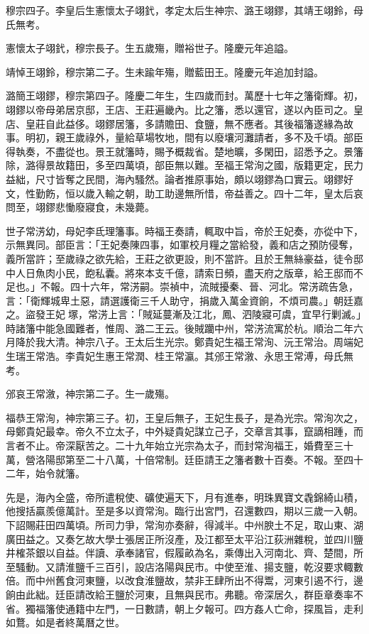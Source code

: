 穆宗四子。李皇后生憲懷太子翊釴，孝定太后生神宗、潞王翊鏐，其靖王翊鈴，母氏無考。

憲懷太子翊釴，穆宗長子。生五歲殤，贈裕世子。隆慶元年追謚。

靖悼王翊鈴，穆宗第二子。生未踰年殤，贈藍田王。隆慶元年追加封謚。

潞簡王翊鏐，穆宗第四子。隆慶二年生，生四歲而封。萬歷十七年之籓衛輝。初，翊鏐以帝母弟居京邸，王店、王莊遍畿內。比之籓，悉以還官，遂以內臣司之。皇店、皇莊自此益侈。翊鏐居籓，多請贍田、食鹽，無不應者。其後福籓遂緣為故事。明初，親王歲祿外，量給草場牧地，間有以廢壤河灘請者，多不及千頃。部臣得執奏，不盡從也。景王就籓時，賜予概裁省。楚地曠，多閑田，詔悉予之。景籓除，潞得景故籍田，多至四萬頃，部臣無以難。至福王常洵之國，版籍更定，民力益絀，尺寸皆奪之民間，海內騷然。論者推原事始，頗以翊鏐為口實云。翊鏐好文，性勤飭，恒以歲入輸之朝，助工助邊無所惜，帝益善之。四十二年，皇太后哀問至，翊鏐悲慟廢寢食，未幾薨。

世子常淓幼，母妃李氐理籓事。時福王奏請，輒取中旨，帝於王妃奏，亦從中下，示無異同。部臣言：「王妃奏陳四事，如軍校月糧之當給發，義和店之預防侵奪，義所當許；至歲祿之欲先給，王莊之欲更設，則不當許。且於王無絲豪益，徒令邸中人日魚肉小民，飽私囊。將來本支千億，請索日頻，盡天府之版章，給王邸而不足也。」不報。四十六年，常淓嗣。崇禎中，流賊擾秦、晉、河北。常淓疏告急，言：「衛輝城卑土惡，請選護衛三千人助守，捐歲入萬金資餉，不煩司農。」朝廷嘉之。盜發王妃塚，常淓上言：「賊延蔓漸及江北，鳳、泗陵寢可虞，宜早行剿滅。」時諸籓中能急國難者，惟周、潞二王云。後賊躪中州，常淓流寓於杭。順治二年六月降於我大清。神宗八子。王太后生光宗。鄭貴妃生福王常洵、沅王常治。周端妃生瑞王常浩。李貴妃生惠王常潤、桂王常瀛。其邠王常漵、永思王常溥，母氏無考。

邠哀王常漵，神宗第二子。生一歲殤。

福恭王常洵，神宗第三子。初，王皇后無子，王妃生長子，是為光宗。常洵次之，母鄭貴妃最幸。帝久不立太子，中外疑貴妃謀立己子，交章言其事，竄謫相踵，而言者不止。帝深厭苦之。二十九年始立光宗為太子，而封常洵福王，婚費至三十萬，營洛陽邸第至二十八萬，十倍常制。廷臣請王之籓者數十百奏。不報。至四十二年，始令就籓。

先是，海內全盛，帝所遣稅使、礦使遍天下，月有進奉，明珠異寶文毳錦綺山積，他搜括贏羨億萬計。至是多以資常洵。臨行出宮門，召還數四，期以三歲一入朝。下詔賜莊田四萬頃。所司力爭，常洵亦奏辭，得減半。中州腴土不足，取山東、湖廣田益之。又奏乞故大學士張居正所沒產，及江都至太平沿江荻洲雜稅，並四川鹽井榷茶銀以自益。伴讀、承奉諸官，假履畝為名，乘傳出入河南北、齊、楚間，所至騷動。又請淮鹽千三百引，設店洛陽與民市。中使至淮、揚支鹽，乾沒要求輙數倍。而中州舊食河東鹽，以改食淮鹽故，禁非王肆所出不得鬻，河東引遏不行，邊餉由此絀。廷臣請改給王鹽於河東，且無與民市。弗聽。帝深居久，群臣章奏率不省。獨福籓使通籍中左門，一日數請，朝上夕報可。四方姦人亡命，探風旨，走利如鶩。如是者終萬曆之世。

